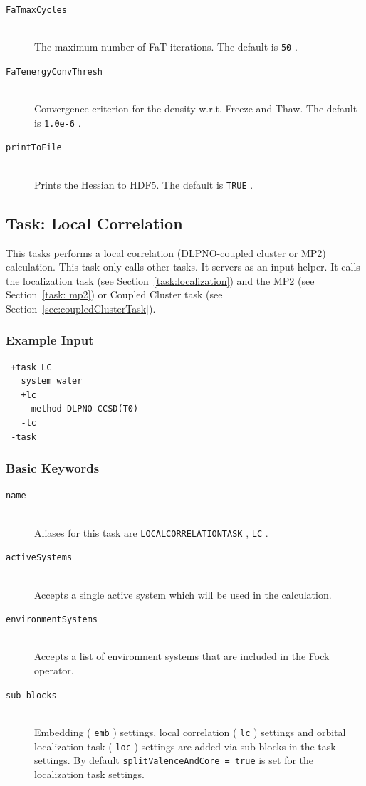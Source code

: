 \documentclass[bibliography=totocnumbered,a4paper,10pt,oneside]{scrbook}
\newcommand{\ttt}[1]{%
  \begingroup\setlength{\fboxsep}{1pt}%
  \colorbox{serenity-green!30}{\texttt{\hspace*{2pt}\vphantom{(g}#1\hspace*{2pt}}}%
  \endgroup
}
\begin{document}
\begin{description}
\item [\texttt{FaTmaxCycles}]\hfill \\
  The maximum number of FaT iterations. The default is \ttt{50}.
\item [\texttt{FaTenergyConvThresh}]\hfill \\
  Convergence criterion for the density w.r.t. Freeze-and-Thaw. The default is \ttt{1.0e-6}.
\item [\texttt{printToFile}]\hfill \\
  Prints the Hessian to HDF5. The default is \ttt{TRUE}.
\end{description}

\subsection{Task: Local Correlation}\label{task:localCorrelation}
This tasks performs a local correlation (DLPNO-coupled cluster or MP2) calculation. This task only
calls other tasks. It servers as an input helper. It calls the localization task
(see Section~\ref{task:localization}) and the MP2 (see Section~\ref{task: mp2}) or Coupled Cluster task
(see Section~\ref{sec:coupledClusterTask}).
\subsubsection{Example Input}
\begin{lstlisting}
 +task LC
   system water
   +lc
     method DLPNO-CCSD(T0)
   -lc
 -task
\end{lstlisting}
\subsubsection{Basic Keywords}
\begin{description}
 \item [\texttt{name}]\hfill \\
   Aliases for this task are \ttt{LOCALCORRELATIONTASK}, \ttt{LC}.
 \item [\texttt{activeSystems}]\hfill \\
   Accepts a single active system which will be used in the calculation.
 \item [\texttt{environmentSystems}]\hfill \\
   Accepts a list of environment systems that are included in the Fock operator.
 \item [\texttt{sub-blocks}]\hfill \\
  Embedding (\ttt{emb}) settings, local correlation (\ttt{lc}) settings and
  orbital localization task (\ttt{loc}) settings are added via sub-blocks in the task settings.
  By default \ttt{splitValenceAndCore = true} is set for the localization task settings.
\end{description}
\end{document}
